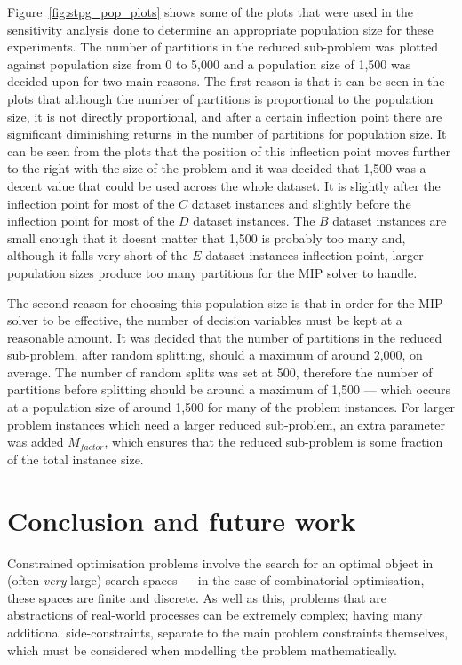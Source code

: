 \documentclass[journal]{IEEEtran}
\begin{document}
Figure~\ref{fig:stpg_pop_plots} shows some of the plots that were used in the sensitivity analysis done to determine an appropriate population size for these experiments. The number of partitions in the reduced sub-problem was plotted against population size from 0 to 5,000 and a population size of 1,500 was decided upon for two main reasons. The first reason is that it can be seen in the plots that although the number of partitions is proportional to the population size, it is not directly proportional, and after a certain inflection point there are significant diminishing returns in the number of partitions for population size. It can be seen from the plots that the position of this inflection point moves further to the right with the size of the problem and it was decided that 1,500 was a decent value that could be used across the whole dataset. It is slightly after the inflection point for most of the \(C\) dataset instances and slightly before the inflection point for most of the \(D\) dataset instances. The \(B\) dataset instances are small enough that it doesnt matter that 1,500 is probably too many and, although it falls very short of the \(E\) dataset instances inflection point, larger population sizes produce too many partitions for the MIP solver to handle.

The second reason for choosing this population size is that in order for the MIP solver to be effective, the number of decision variables must be kept at a reasonable amount. It was decided that the number of partitions in the reduced sub-problem, after random splitting, should a maximum of around 2,000, on average. The number of random splits was set at 500, therefore the number of partitions before splitting should be around a maximum of 1,500 --- which occurs at a population size of around 1,500 for many of the problem instances. For larger problem instances which need a larger reduced sub-problem, an extra parameter was added \(M_{factor}\), which ensures that the reduced sub-problem is some fraction of the total instance size.

\section{Conclusion and future work}

Constrained optimisation problems involve the search for an optimal object in (often \emph{very} large) search spaces --- in the case of combinatorial optimisation, these spaces are finite and discrete. As well as this, problems that are abstractions of real-world processes can be extremely complex; having many additional side-constraints, separate to the main problem constraints themselves, which must be considered when modelling the problem mathematically.
\end{document}
